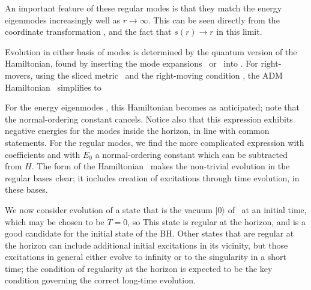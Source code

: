 An important feature of these regular modes is that they match the energy eigenmodes increasingly well as $r\rightarrow\infty$.  This can be seen directly from the coordinate transformation \XtorT, and the fact that $s(r)\rightarrow r$ in this limit.



Evolution in either basis of modes is determined by the quantum version of the Hamiltonian, found by inserting the mode expansions \omexp\ or \kexp\  into \admham.  For right-movers, using the sliced metric \admvars\ and the right-moving condition \RMp, the ADM Hamiltonian \admham\ simplifies to
%
\eqn{}
%

For the energy eigenmodes \omps, this Hamiltonian becomes
%
\eqn{}
%
as anticipated; note that the normal-ordering constant cancels.  Notice also that this expression exhibits negative energies for the modes inside the horizon, in line with  common statements. For the regular modes, we find the more complicated expression
%
\eqn{}
%
with coefficients
%
\eqn{}
%
and with $E_0$ a normal-ordering constant which can be subtracted from $H$.  The form of the Hamiltonian \hamreg\ makes the non-trivial evolution in the regular bases clear; it includes creation of excitations through time evolution, in these bases.


We now consider evolution of a state that is the vacuum $|0\rangle$ of \rvac\ at an initial time, which may be chosen to be $T=0$, so
%
\eqn{}
%
 This state is regular at the horizon, and is a good candidate for the initial state of the BH.  Other states that are regular at the horizon can include additional initial excitations in its vicinity, but those excitations in general either evolve to infinity or to the singularity in a short time; the condition of regularity at the horizon is expected to be the key condition governing the correct long-time evolution.
 
